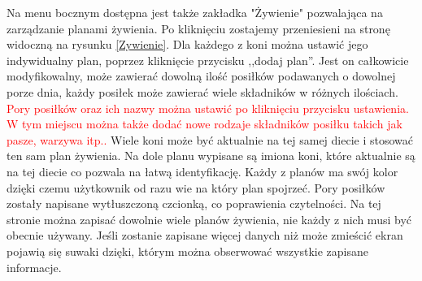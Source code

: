 \documentclass[12pt,oneside]{report}
\begin{document}
Na menu bocznym dostępna jest także zakładka "Żywienie" pozwalająca na zarządzanie planami żywienia. Po kliknięciu zostajemy przeniesieni na stronę widoczną na rysunku \ref{Zywienie}. Dla każdego z koni można ustawić jego indywidualny plan, poprzez kliknięcie przycisku ,,dodaj plan''. Jest on całkowicie modyfikowalny, może zawierać dowolną ilość posiłków podawanych o dowolnej porze dnia, każdy posiłek może zawierać wiele składników w różnych ilościach. \textcolor{red}{Pory posiłków oraz ich nazwy można ustawić po kliknięciu przycisku ustawienia. W tym miejscu można także dodać nowe rodzaje składników posiłku takich jak pasze, warzywa itp..} Wiele koni może być aktualnie na tej samej diecie i stosować ten sam plan żywienia. Na dole planu wypisane są imiona koni, które aktualnie są na tej diecie co pozwala na łatwą identyfikację. Każdy z planów ma swój kolor dzięki czemu użytkownik od razu wie na który plan spojrzeć. Pory posiłków zostały napisane wytłuszczoną czcionką, co poprawienia czytelności. Na tej stronie można zapisać dowolnie wiele planów żywienia, nie każdy z nich musi być obecnie używany. Jeśli zostanie zapisane więcej danych niż może zmieścić ekran pojawią się suwaki dzięki, którym można obserwować wszystkie zapisane informacje.
\end{document}

